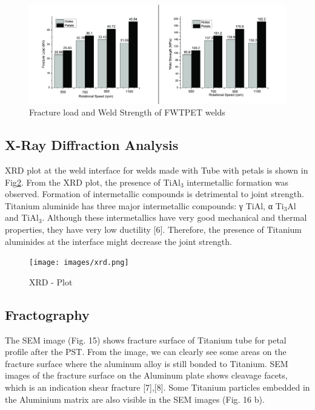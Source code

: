 \documentclass[3p]{elsarticle}
\begin{document}
\begin{figure}[H]
\centering
\includegraphics[width=\textwidth,keepaspectratio]{images/Strength.jpg}
\caption{Fracture load and Weld Strength of FWTPET welds}
\label{fig:weld-strength}
\end{figure}

\subsection{X-Ray Diffraction Analysis}
\label{subsec:XRD-Results}
XRD plot at the weld interface for welds made with Tube with petals is shown in Fig\ref{fig:xrd-plot}. From the XRD plot, the presence of TiAl$_{3}$ intermetallic formation was observed. Formation of intermetallic compounds is detrimental to joint strength. Titanium aluminide has three major intermetallic compounds: γ TiAl, α Ti$_{3}$Al and TiAl$_{3}$. Although these intermetallics have very good mechanical and thermal properties, they have very low ductility [6]. Therefore, the presence of Titanium aluminides at the interface might decrease the joint strength.

\begin{figure}[H]
\centering
\texttt{[image: images/xrd.png]}
\caption{XRD - Plot}
\label{fig:xrd-plot}
\end{figure}

\subsection{Fractography}
\label{subsec:Fractography}
The SEM image (Fig. 15) shows fracture surface of Titanium tube for petal profile after the PST. From the image, we can clearly see some areas on the fracture surface where the aluminum alloy is still bonded to Titanium. SEM images of the fracture surface on the Aluminum plate shows cleavage facets, which is an indication shear fracture [7],[8]. Some Titanium particles embedded in the Aluminium matrix are also visible in
the SEM images (Fig. 16 b).
\end{document}
